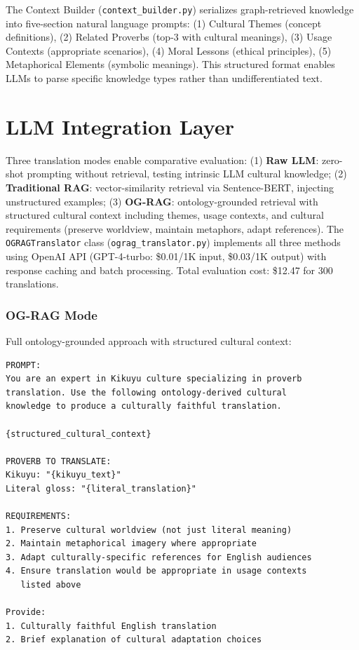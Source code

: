 The Context Builder (\texttt{context\_builder.py}) serializes graph-retrieved knowledge into five-section natural language prompts: (1) Cultural Themes (concept definitions), (2) Related Proverbs (top-3 with cultural meanings), (3) Usage Contexts (appropriate scenarios), (4) Moral Lessons (ethical principles), (5) Metaphorical Elements (symbolic meanings). This structured format enables LLMs to parse specific knowledge types rather than undifferentiated text.

\section{LLM Integration Layer}
\label{sec:llm_integration}

Three translation modes enable comparative evaluation: (1) \textbf{Raw LLM}: zero-shot prompting without retrieval, testing intrinsic LLM cultural knowledge; (2) \textbf{Traditional RAG}: vector-similarity retrieval via Sentence-BERT, injecting unstructured examples; (3) \textbf{OG-RAG}: ontology-grounded retrieval with structured cultural context including themes, usage contexts, and cultural requirements (preserve worldview, maintain metaphors, adapt references). The \texttt{OGRAGTranslator} class (\texttt{ograg\_translator.py}) implements all three methods using OpenAI API (GPT-4-turbo: \$0.01/1K input, \$0.03/1K output) with response caching and batch processing. Total evaluation cost: \$12.47 for 300 translations.

\subsubsection{OG-RAG Mode}
\label{subsubsec:ograg_mode}

Full ontology-grounded approach with structured cultural context:

\begin{verbatim}
PROMPT:
You are an expert in Kikuyu culture specializing in proverb
translation. Use the following ontology-derived cultural 
knowledge to produce a culturally faithful translation.

{structured_cultural_context}

PROVERB TO TRANSLATE:
Kikuyu: "{kikuyu_text}"
Literal gloss: "{literal_translation}"

REQUIREMENTS:
1. Preserve cultural worldview (not just literal meaning)
2. Maintain metaphorical imagery where appropriate
3. Adapt culturally-specific references for English audiences
4. Ensure translation would be appropriate in usage contexts
   listed above

Provide:
1. Culturally faithful English translation
2. Brief explanation of cultural adaptation choices
\end{verbatim}

